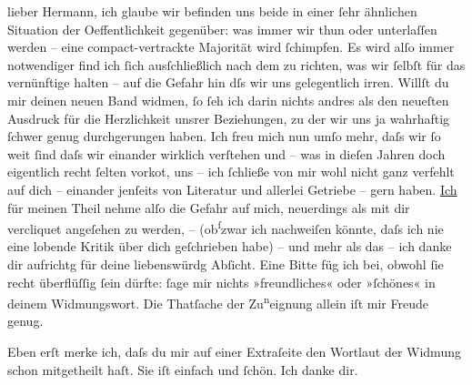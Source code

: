 \pstart{}lieber Hermann,\pend\vspace{0.5em}
\pstart
           ich glaube wir befinden uns beide in einer{ }ſehr ähnlichen Situation der
               Oeffentlichkeit gegenüber: was immer wir thun oder unterlaſſen werden – eine
               compact-vertrackte Majorität wird{ }ſchimpfen. Es wird alſo immer notwendiger find ich{ }ſich ausſchließlich nach dem zu richten, was wir{ }ſelbſt für das vernünftige halten –
               auf die Gefahr hin dſs wir uns ge{\pb}legentlich irren.
               Willſt du mir deinen neuen
                  Band widmen,{ }ſo{ }ſeh ich darin nichts andres als den neueſten Ausdruck für die
               Herzlichkeit unsrer Beziehungen, zu der wir uns ja wahrhaftig{ }ſchwer genug
               durchgerungen haben. Ich freu mich nun umſo mehr, daſs wir{ }ſo weit{ }ſind daſs wir
               einander wirklich verſtehen und – was in dieſen Jahren {\pb}doch eigentlich recht{ }ſelten vorko{\geminationm}t, uns – ich{ }ſchließe von mir wohl nicht
               ganz verfehlt auf dich – einander jenſeits von Literatur und allerlei Getriebe – gern
               haben. \uline{Ich} für meinen Theil nehme alſo die Gefahr auf
               mich, neuerdings als mit dir vercliquet angeſehen zu werden, \introOben{}–\introOben{} (ob\substVorne{}\textsuperscript{ſ}\substDazwischen{}z\substHinten{}war ich nachweiſen könnte, daſs ich nie eine lobende Kritik über dich
               geſchrieben habe) – und {\pb}mehr als das – ich danke dir aufrichtg für deine liebenswürdg Abſicht. Eine Bitte
               füg ich bei, obwohl{ }ſie recht überflüſſig{ }ſein dürfte:{ }ſage mir nichts »freundliches«
               oder »ſchönes« in deinem Widmungswort. Die Thatſache der Zu\substVorne{}\textsuperscript{n}\substDazwischen{}ei\substHinten{}gnung allein iſt mir Freude genug.\pend
           
\pstart
           Eben erſt merke ich, daſs du mir auf einer Extraſeite den Wortlaut der Widmung schon
               mitgetheilt haſt. Sie iſt einfach und{ }ſchön. Ich danke dir.\pend
           

